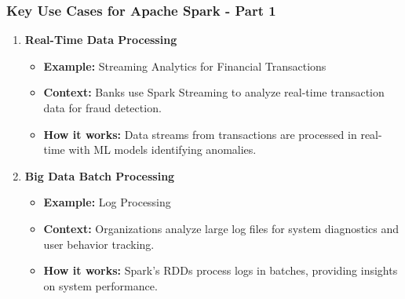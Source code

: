\documentclass[aspectratio=169]{beamer}
\begin{document}
\begin{frame}
    \frametitle{Key Use Cases for Apache Spark - Part 1}
    \begin{enumerate}
        \item \textbf{Real-Time Data Processing}
            \begin{itemize}
                \item \textbf{Example:} Streaming Analytics for Financial Transactions
                \item \textbf{Context:} Banks use Spark Streaming to analyze real-time transaction data for fraud detection.
                \item \textbf{How it works:} Data streams from transactions are processed in real-time with ML models identifying anomalies.
            \end{itemize}
        
        \item \textbf{Big Data Batch Processing}
            \begin{itemize}
                \item \textbf{Example:} Log Processing
                \item \textbf{Context:} Organizations analyze large log files for system diagnostics and user behavior tracking.
                \item \textbf{How it works:} Spark's RDDs process logs in batches, providing insights on system performance.
            \end{itemize}
    \end{enumerate}
\end{frame}
\end{document}
